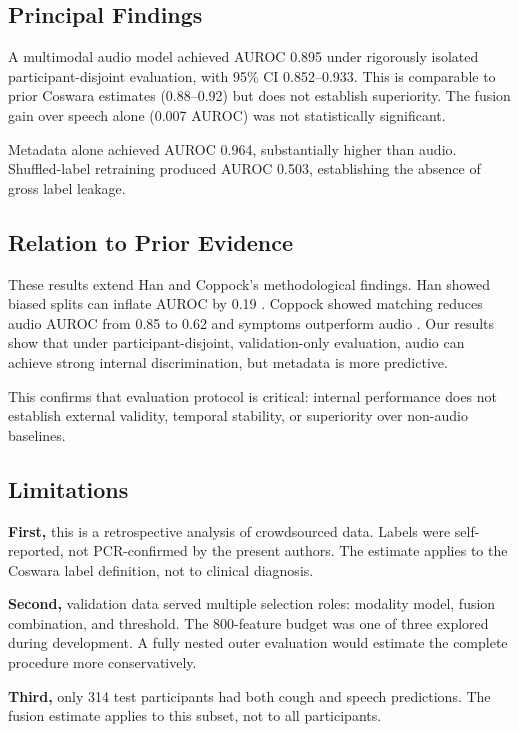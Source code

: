 \documentclass[conference]{IEEEtran}
\begin{document}
\subsection{Principal Findings}

A multimodal audio model achieved AUROC 0.895 under rigorously isolated participant-disjoint evaluation, with 95\% CI 0.852--0.933. This is comparable to prior Coswara estimates (0.88--0.92) but does not establish superiority. The fusion gain over speech alone (0.007 AUROC) was not statistically significant.

Metadata alone achieved AUROC 0.964, substantially higher than audio. Shuffled-label retraining produced AUROC 0.503, establishing the absence of gross label leakage.

\subsection{Relation to Prior Evidence}

These results extend Han and Coppock's methodological findings. Han showed biased splits can inflate AUROC by 0.19 \cite{han2022realistic}. Coppock showed matching reduces audio AUROC from 0.85 to 0.62 and symptoms outperform audio \cite{coppock2024audio}. Our results show that under participant-disjoint, validation-only evaluation, audio can achieve strong internal discrimination, but metadata is more predictive.

This confirms that evaluation protocol is critical: internal performance does not establish external validity, temporal stability, or superiority over non-audio baselines.

\subsection{Limitations}

\textbf{First,} this is a retrospective analysis of crowdsourced data. Labels were self-reported, not PCR-confirmed by the present authors. The estimate applies to the Coswara label definition, not to clinical diagnosis.

\textbf{Second,} validation data served multiple selection roles: modality model, fusion combination, and threshold. The 800-feature budget was one of three explored during development. A fully nested outer evaluation would estimate the complete procedure more conservatively.

\textbf{Third,} only 314 test participants had both cough and speech predictions. The fusion estimate applies to this subset, not to all participants.
\end{document}
